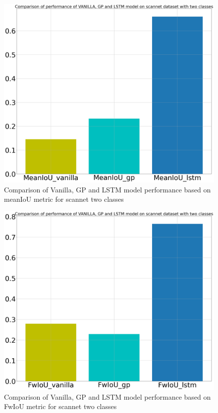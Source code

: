 	\begin{figure}
		\centering
		\includegraphics[width=12cm]{images/two_classes_meanIoU.png}
		\caption{Comparison of Vanilla, GP and LSTM model performance based on meanIoU metric for scannet two classes}
		\label{fig:unet_model_metric_comparison}
	\end{figure}

	\begin{figure}
		\centering
		\includegraphics[width=12cm]{images/two_classes_FwIoU.png}
		\caption{Comparison of Vanilla, GP and LSTM model performance based on FwIoU metric for scannet two classes}
		\label{fig:unet_model_metric_comparison}
	\end{figure}
